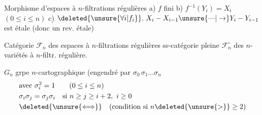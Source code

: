 Morphisme d'espaces à $n$-filtrations régulières
a) $f$ fini
b) $f^{-1}(Y_i)=X_i$ \qquad $(0\leq i\leq n)$
c) $\deleted{\unsure{\forall i|f_i}}.\ X_i-X_{i-1}\unsure{\text{---}|\to}Y_i-Y_{i-1}$ est étale (donc un rev. étale)

Catégorie $\mathcal F_n$ des espaces à $n$-filtrations régulières ss-catégorie pleine  $\mathcal F_n^\circ$ des  $n$-variétés à $n$-filtr. régulière.

$G_n$ grpe $n$-cartographique (engendré par $\sigma_0\,\sigma_1\ldots\sigma_n$
\[ \begin{aligned}&\text{avec }\sigma_i^2=1\qquad(0\leq i\leq n)\\ &\sigma_i\sigma_j=\sigma_j\sigma_i\quad\text{si }n\geq j\geq i+2,\ i\geq0\\ &\deleted{\unsure{\Longleftrightarrow}}\quad\text{(condition si }n\deleted{\unsure{>}}\geq2) \end{aligned} \]


